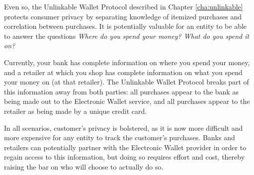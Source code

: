 Even so, the Unlinkable Wallet Protocol described in Chapter \ref{cha:unlinkable} protects consumer privacy
    by separating knowledge of itemized purchases and correlation between purchases.
It is potentially valuable for an entity to be able to answer the questions \emph{Where do you spend your money? What do you spend it on?}

Currently, your bank has complete information on where you spend your money,
    and a retailer at which you shop has complete information on what you spend your money on (at that retailer).
The Unlinkable Wallet Protocol breaks part of this information away from both parties:
    all purchases appear to the bank as being made out to the Electronic Wallet service, and
    all purchases appear to the retailer as being made by a unique credit card.

In all scenarios, customer's privacy is bolstered, as it is now more difficult and more expensive for any entity to track the customer's purchases.
Banks and retailers can potentially partner with the Electronic Wallet provider in order to regain access to this information,
    but doing so requires effort and cost, thereby raising the bar on who will choose to actually do so.